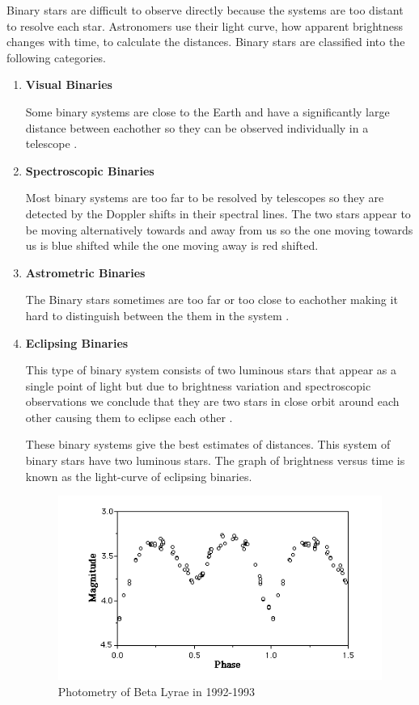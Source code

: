Binary stars are difficult to observe directly because the systems are too distant to resolve each star. Astronomers use their light curve, how apparent brightness changes with time, to calculate the distances. Binary stars are classified into the following categories.

\begin{enumerate}

\item\textbf{Visual Binaries}

Some binary systems are close to the Earth and have a significantly large distance between eachother so they can be observed individually in a telescope \cite{sys_1}.

\item \textbf{ Spectroscopic Binaries }

Most binary systems are too far to be resolved by telescopes so they are detected by the Doppler shifts in their spectral lines. The two stars appear to be moving alternatively towards and away from us so the one moving towards us is blue shifted while the one moving away is red shifted.


\item \textbf{Astrometric Binaries}

The Binary stars sometimes are too far or too close to eachother making it hard to distinguish between the them in the system \cite{astrometric_binaries}.


\item \textbf{Eclipsing Binaries}

This type of binary system consists of two luminous stars that appear as a single point of light but due to brightness variation and spectroscopic observations we conclude that they are two stars in close orbit around each other causing them to eclipse each other \cite{eclipsing_binaries}.


These binary systems give the best estimates of distances. This system of binary stars have two luminous stars. The graph of brightness versus time is known as the light-curve of eclipsing binaries.

\begin{figure} [h]
\centering
\includegraphics[scale=0.5]{LC}
\caption{Photometry of Beta Lyrae in 1992-1993 \cite{eclipsing_binaries}}
\end{figure}

\end{enumerate}

